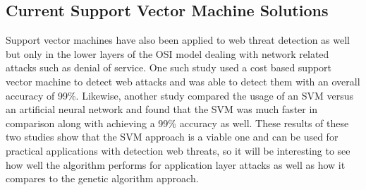 \subsection{Current Support Vector Machine Solutions} \label{sec:SVMSolutions}

Support vector machines have also been applied to web threat detection as well but only in the lower layers of the OSI model dealing with network related attacks such as denial of service.  One such study used a cost based support vector machine to detect web attacks and was able to detect them with an overall accuracy of 99\%. \cite{intrusionDetectionCostBased}  Likewise, another study compared the usage of an SVM versus an artificial neural network and found that the SVM was much faster in comparison along with achieving a 99\% accuracy as well. \cite{intrusionDetectionNeural}  These results of these two studies show that the SVM approach is a viable one and can be used for practical applications with detection web threats, so it will be interesting to see how well the algorithm performs for application layer attacks as well as how it compares to the genetic algorithm approach.


